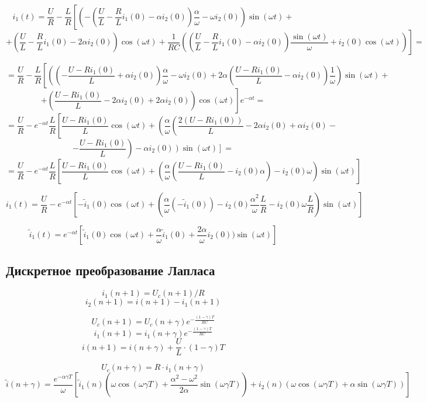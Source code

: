 \documentclass[a4paper,12pt]{article}
\begin{document}
$$
i_1(t) = \frac{U}{R} - \frac{L}{R}\left[\left(-\left(\frac{U}{L}-\frac{R}{L}i_1(0) 
- \alpha i_2(0)\right)\frac{\alpha}{\omega}  -\omega i_2(0)\right)\sin(\omega t)\right. +
$$
$$
+\!\left.\left(\!\frac{U}{L}-\frac{R}{L}i_1(0) -2\alpha i_2(0)\!\right)\!\cos(\omega t)
 +
\frac{1}{RC}\!\left(\!\!\left(\frac{U}{L} - \frac{R}{L}i_1(0) -\alpha i_2(0)\!\right)\!\frac{\sin(\omega t)}{\omega}
+i_2(0)\cos(\omega t)\right)
\right]=
$$

$$
= \frac{U}{R} - \frac{L}{R} \!\left[\left(\!\!\left(-\frac{U-Ri_1(0)}{L} + \alpha i_2(0) %
\!\right)\!\frac{\alpha}{\omega} -\omega i_2(0)+ 2\alpha \left(\frac{U - Ri_1(0)}{L} - \alpha i_2(0)\right)\frac{1}{\omega}
\!\right)\sin(\omega t)\right. +
$$
$$
+ \left.\left(\frac{U -Ri_1(0)}{L} - 2\alpha i_2(0) + 2\alpha i_2(0) \right)\cos(\omega t)\right]
e^{-\alpha t} =
$$
$$
=\frac{U}{R} - e^{-\alpha t}\frac{L}{R}\left[\frac{U-Ri_1(0)}{L}\cos(\omega t) +
\left(\frac{\alpha}{\omega} \left( \frac{2(U-Ri_1(0))}{L}  -2 \alpha i_2(0) + \alpha i_2(0) 
\right.\right.\right. -
$$
$$
-\left.\frac{U-Ri_1(0)}{L}\right) 
-\left.\left.\alpha i_2(0)\right)\sin(\omega t)\right] =
$$
$$
=\frac{U}{R} - e^{-\alpha t} \frac{L}{R}\left[\frac{U-Ri_1(0)}{L}\cos(\omega t) +
\left(\frac{\alpha}{\omega}
\left(\frac{U-Ri_1(0)}{L} - i_2(0)\alpha\right) - i_2(0)\omega
\right)\sin(\omega t) 
\right]
$$

$$
i_1(t)=\frac{U}{R} - e^{-\alpha t} \left[ -\tilde{i}_1(0)\cos(\omega t)  + 
\left( \frac{\alpha}{\omega}\left(-\tilde{i}_1(0)\right) -i_2(0)\frac{\alpha^2}{\omega}\frac{L}{R}
- i_2(0)\omega\frac{L}{R} \right)\sin(\omega t ) %
\right]
$$

$$
\tilde{i}_1(t) = e^{-\alpha t}\left[ \tilde{i}_1(0)\cos(\omega t) + \frac{\alpha}{\omega}\tilde{i}_1(0) + 
\frac{2\alpha}{\omega} i_2(0)) \sin(\omega t)\right]
$$

\subsection{Дискретное преобразование Лапласа}

$$
i_1(n+1) = U_c(n+1)/R
$$
$$
i_2(n+1) = i(n+1) - i_1(n+1)
$$

$$
U_c(n+1) = U_c(n+\gamma) e^{-\frac{(1-\gamma)T}{RC}}
$$
$$
i_1(n+1) = i_1(n+\gamma) e^{-\frac{(1-\gamma)T}{RC}}
$$
$$
i(n+1) = i(n+\gamma) + \frac{U}{L}\cdot (1-\gamma)T
$$

$$
U_c(n+\gamma) = R\cdot i_1(n+\gamma)
$$
$$
\tilde{i}(n+\gamma) = \frac{e^{-\alpha\gamma T}}{\omega} 
\left[
\tilde{i}_1(n)\left(\omega\cos(\omega\gamma T) + \frac{\alpha^2 - \omega^2}{2\alpha}\sin(\omega\gamma T) \right)
+ i_2(n)\left(\omega\cos(\omega\gamma T)  + \alpha\sin(\omega\gamma T)\right)
\right]
$$
\end{document}
